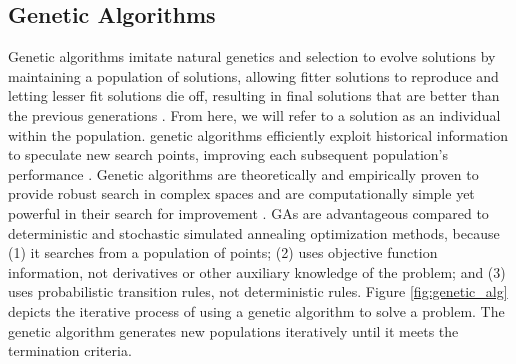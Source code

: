 \subsection{Genetic Algorithms}
\label{sec:genetic_alg}
Genetic algorithms imitate natural genetics and selection to evolve solutions 
by maintaining a population of solutions, allowing fitter solutions to reproduce
and letting lesser fit solutions die off, resulting in final solutions that are 
better than the previous generations \cite{renner_genetic_2003}. 
From here, we will refer to a solution as an individual within the population. 
genetic algorithms efficiently exploit historical information to speculate new search 
points, improving each subsequent population's performance 
\cite{goldberg_genetic_1989}. 
Genetic algorithms are theoretically and empirically proven to provide robust 
search in complex spaces and are computationally simple yet powerful 
in their search for improvement \cite{goldberg_genetic_1989}. 
GAs are advantageous compared to deterministic and stochastic simulated 
annealing optimization methods, because (1) it searches from a population of 
points; (2) uses objective function information, not derivatives or other 
auxiliary knowledge of the problem; and (3) uses probabilistic transition 
rules, not deterministic rules. 
Figure \ref{fig:genetic_alg} depicts the iterative process of using a genetic algorithm
to solve a problem. 
The genetic algorithm generates new populations iteratively until it meets the termination 
criteria. 

